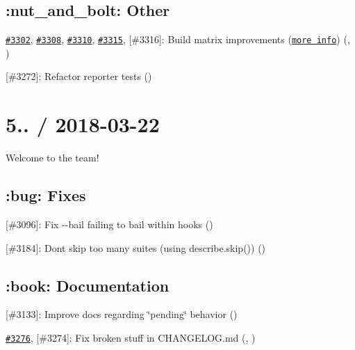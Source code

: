 \subsection*{\+:nut\+\_\+and\+\_\+bolt\+: Other}


\begin{DoxyItemize}
\item \href{https://github.com/mochajs/mocha/pull/3302}{\tt \#3302}, \href{https://github.com/mochajs/mocha/pull/3308}{\tt \#3308}, \href{https://github.com/mochajs/mocha/pull/3310}{\tt \#3310}, \href{https://github.com/mochajs/mocha/pull/3315}{\tt \#3315}, \mbox{[}\#3316\mbox{]}\+: Build matrix improvements (\href{https://boneskull.com/mocha-and-travis-ci-build-stages/}{\tt more info}) (\href{https://github.com/outsideris}{\tt }, \href{https://github.com/boneskull}{\tt })
\item \mbox{[}\#3272\mbox{]}\+: Refactor reporter tests (\href{https://github.com/jMuzsik}{\tt })
\end{DoxyItemize}

\section*{5.. / 2018-\/03-\/22}

Welcome \href{https://github.com/outsideris}{\tt } to the team!

\subsection*{\+:bug\+: Fixes}


\begin{DoxyItemize}
\item \mbox{[}\#3096\mbox{]}\+: Fix {\ttfamily -\/-\/bail} failing to bail within hooks (\href{https://github.com/outsideris}{\tt })
\item \mbox{[}\#3184\mbox{]}\+: Don\textquotesingle{}t skip too many suites (using {\ttfamily describe.\+skip()}) (\href{https://github.com/outsideris}{\tt })
\end{DoxyItemize}

\subsection*{\+:book\+: Documentation}


\begin{DoxyItemize}
\item \mbox{[}\#3133\mbox{]}\+: Improve docs regarding \char`\"{}pending\char`\"{} behavior (\href{https://github.com/ematicipo}{\tt })
\item \href{https://github.com/mochajs/mocha/pull/3276}{\tt \#3276}, \mbox{[}\#3274\mbox{]}\+: Fix broken stuff in {\ttfamily C\+H\+A\+N\+G\+E\+L\+O\+G.\+md} (\href{https://github.com/tagoro9}{\tt }, \href{https://github.com/honzajavorek}{\tt })
\end{DoxyItemize}

